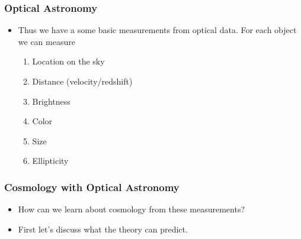 \documentclass{beamer}
\begin{document}
\frame
{

    \frametitle{Optical Astronomy}


    \begin{itemize}

        \item Thus we have a some basic measurements from optical data.  For
            each object we can measure

            \begin{enumerate}

                \item Location on the sky

                \item Distance (velocity/redshift)

                \item Brightness

                \item Color

                \item Size

                \item Ellipticity

            \end{enumerate}


    \end{itemize}

}

\frame
{

    \frametitle{Cosmology with Optical Astronomy}


    \begin{itemize}

        \item How can we learn about cosmology from these measurements?

        \item First let's discuss what the theory can predict.

    \end{itemize}

}
\end{document}

